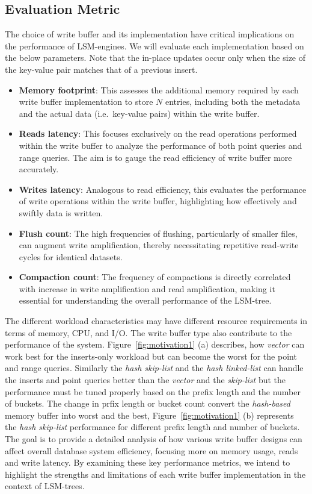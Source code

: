 \subsection{Evaluation Metric}
The choice of write buffer and its implementation have critical implications on the performance of LSM-engines. 
We will evaluate each implementation based on 
the below parameters. 
Note that the in-place updates occur only when the size of the key-value pair matches that of a 
previous insert.
\begin{itemize}[leftmargin=*,labelindent=0mm, itemsep=0.2\baselineskip]
    \item \textbf{Memory footprint}: This assesses the additional memory required by each write buffer implementation to 
    store $N$ entries, including both the metadata and the actual data (i.e.\ key-value pairs) within the write buffer.
    \item \textbf{Reads latency}: This focuses exclusively on the read operations performed within the write buffer to analyze 
    the performance of both point queries and range queries. The aim is to gauge the read efficiency of write buffer more accurately.
    \item \textbf{Writes latency}: Analogous to read efficiency, this evaluates the performance of write operations within 
    the write buffer, highlighting how effectively and swiftly data is written.
    \item \textbf{Flush count}: The high frequencies of flushing, particularly of smaller files, can augment write 
    amplification, thereby necessitating repetitive read-write cycles for identical datasets.
    \item \textbf{Compaction count}: The frequency of compactions is directly correlated with increase in write 
    amplification and read amplification, making it essential for understanding the overall performance of the LSM-tree.
\end{itemize}
The different workload characteristics may have different resource requirements in terms of memory, CPU, and I/O. 
The write buffer type also contribute to the performance of the system.
Figure~\ref{fig:motivation1} (a) describes, how \textit{vector} can work best for the inserts-only workload but can become the worst for the point and range queries. Similarly the \textit{hash skip-list} and the \textit{hash linked-list} can handle the inserts and point queries better than the \textit{vector} and the \textit{skip-list} but the performance must be tuned properly based on the prefix length and the number of buckets. 
The change in prfix length or bucket count convert the \textit{hash-based} memory buffer into worst and the best, Figure~\ref{fig:motivation1} (b) represents the \textit{hash skip-list} performance
for different prefix length and number of buckets. 
The goal is to provide a detailed analysis of how various write buffer designs can affect overall database system 
efficiency, focusing more on memory usage, reads and write latency. By examining these key performance metrics, we 
intend to highlight the strengths and limitations of each write buffer implementation in the context of LSM-trees.